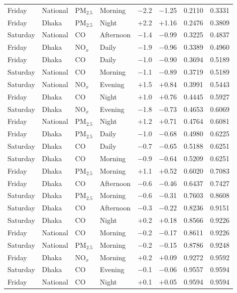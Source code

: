 \begin{longtable}{L{1.5cm} L{1.4cm} L{1.1cm} L{1.6cm} C{1.3cm} C{1.3cm} C{1.4cm} C{1.4cm}}
Friday & National & PM$_{2.5}$ & Morning & $-$2.2 & $-$1.25 & 0.2110 & 0.3331 \\
Friday & Dhaka & PM$_{2.5}$ & Night & $+$2.2 & $+$1.16 & 0.2476 & 0.3809 \\
Saturday & National & CO & Afternoon & $-$1.4 & $-$0.99 & 0.3225 & 0.4837 \\
Friday & Dhaka & NO$_x$ & Daily & $-$1.9 & $-$0.96 & 0.3389 & 0.4960 \\
Friday & Dhaka & CO & Daily & $-$1.0 & $-$0.90 & 0.3694 & 0.5189 \\
Saturday & National & CO & Morning & $-$1.1 & $-$0.89 & 0.3719 & 0.5189 \\
Saturday & National & NO$_x$ & Evening & $+$1.5 & $+$0.84 & 0.3991 & 0.5443 \\
Friday & Dhaka & CO & Night & $+$1.0 & $+$0.76 & 0.4445 & 0.5927 \\
Saturday & Dhaka & NO$_x$ & Evening & $-$1.8 & $-$0.73 & 0.4653 & 0.6069 \\
Friday & National & PM$_{2.5}$ & Night & $+$1.2 & $+$0.71 & 0.4764 & 0.6081 \\
Friday & Dhaka & PM$_{2.5}$ & Daily & $-$1.0 & $-$0.68 & 0.4980 & 0.6225 \\
Saturday & Dhaka & CO & Daily & $-$0.7 & $-$0.65 & 0.5188 & 0.6251 \\
Saturday & Dhaka & CO & Morning & $-$0.9 & $-$0.64 & 0.5209 & 0.6251 \\
Friday & Dhaka & PM$_{2.5}$ & Morning & $+$1.1 & $+$0.52 & 0.6020 & 0.7083 \\
Friday & Dhaka & CO & Afternoon & $-$0.6 & $-$0.46 & 0.6437 & 0.7427 \\
Saturday & Dhaka & PM$_{2.5}$ & Morning & $-$0.6 & $-$0.31 & 0.7603 & 0.8608 \\
Saturday & Dhaka & CO & Afternoon & $-$0.3 & $-$0.22 & 0.8236 & 0.9151 \\
Saturday & Dhaka & CO & Night & $+$0.2 & $+$0.18 & 0.8566 & 0.9226 \\
Friday & National & CO & Morning & $-$0.2 & $-$0.17 & 0.8611 & 0.9226 \\
Saturday & National & PM$_{2.5}$ & Morning & $-$0.2 & $-$0.15 & 0.8786 & 0.9248 \\
Friday & Dhaka & NO$_x$ & Morning & $+$0.2 & $+$0.09 & 0.9272 & 0.9592 \\
Saturday & Dhaka & CO & Evening & $-$0.1 & $-$0.06 & 0.9557 & 0.9594 \\
Friday & National & CO & Night & $+$0.1 & $+$0.05 & 0.9594 & 0.9594 \\
\end{longtable}
\endgroup
